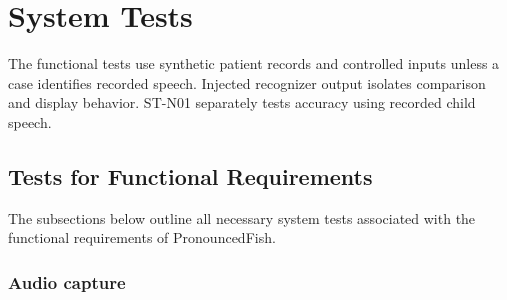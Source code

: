\documentclass[12pt, titlepage]{article}
\begin{document}
\section{System Tests}

The functional tests use synthetic patient records and controlled inputs
unless a case identifies recorded speech. Injected recognizer output
isolates comparison and display behavior. ST-N01 separately tests accuracy
using recorded child speech.

\subsection{Tests for Functional Requirements}

The subsections below outline all necessary system tests associated with the functional 
requirements of PronouncedFish.

\subsubsection{Audio capture}
\end{document}

